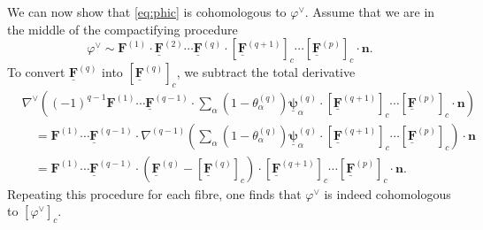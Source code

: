 \documentclass[11pt]{article}
\newcommand{\nn}{\nonumber}
\newcommand{\be}{\begin{equation}}
\newcommand{\ee}{\end{equation}}
\newcommand{\vphi}{\varphi}
\newcommand{\bs}[1]{\boldsymbol{#1}}
\begin{document}

We can now show that \eqref{eq:phic} is cohomologous to $\vphi^\vee$. Assume that we are in the middle of the compactifying procedure
\be
	\vphi^\vee \sim 
	\bs{F}^{(1)} \cdot \underline{\bs{F}}^{(2)} \cdots 
		\underline{\bs{F}}^{(q)} \cdot [\underline{\bs{F}}^{(q+1)}]_c \cdots [\underline{\bs{F}}^{(p)}]_c \cdot \bs{n}. 
\ee
To convert $\underline{\bs{F}}^{(q)}$ into $[\underline{\bs{F}}^{(q)}]_c$, we subtract the total derivative 
\begin{align}
	&\nabla^\vee \left( (-1)^{q-1}
		\bs{F}^{(1)} \cdots \underline{\bs{F}}^{(q-1)} 
		\cdot \sum_{\alpha} (1-\theta^{(q)}_\alpha) \underline{\bs{\psi}}^{(q)}_{\alpha}  
		\cdot [\underline{\bs{F}}^{(q+1)}]_c \cdots [\underline{\bs{F}}^{(p)}]_c
		\cdot \bs{n}
		\right) 
	\nn \\ &\quad 
	= \bs{F}^{(1)} \cdots \underline{\bs{F}}^{(q-1)}
		\cdot \nabla^{(q-1)} 
		\left( \sum_{\alpha} (1-\theta^{(q)}_\alpha) \underline{\bs{\psi}}^{(q)}_{\alpha}  
		\cdot [\underline{\bs{F}}^{(q+1)}]_c \cdots [\underline{\bs{F}}^{(p)}]_c \right)
		\cdot \bs{n}
	\nn\\&\quad
	= \bs{F}^{(1)} \cdots \underline{\bs{F}}^{(q-1)}
		\cdot \left( \underline{\bs{F}}^{(q)} - [\underline{\bs{F}}^{(q)}]_c \right)
		\cdot [\underline{\bs{F}}^{(q+1)}]_c \cdots [\underline{\bs{F}}^{(p)}]_c
		\cdot \bs{n}.
\end{align}
Repeating this procedure for each fibre, one finds that $\vphi^\vee$ is indeed cohomologous to $[\vphi^\vee]_c$. 
\end{document}
